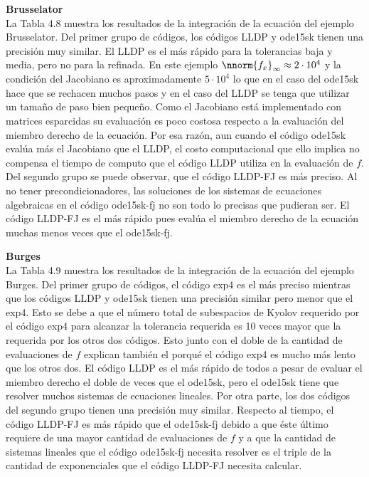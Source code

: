 \textbf{Brusselator}\\
La Tabla 4.8 muestra los resultados de la integración de la ecuación del ejemplo Brusselator. Del primer grupo de códigos, los códigos LLDP y ode15sk tienen una precisión muy similar. El LLDP es el más rápido para la tolerancias baja y media, pero no para la refinada. En este ejemplo $\nnorm{f_x}_\infty\approx 2\cdot 10^4$ y la condición del Jacobiano es aproximadamente $5\cdot10^4$ lo que en el caso del ode15sk hace que se rechacen muchos pasos y en el caso del LLDP se tenga que utilizar un tama\~no de paso bien peque\~no. Como el Jacobiano está implementado con matrices esparcidas su evaluación es poco costosa respecto a la evaluación del miembro derecho de la ecuación. Por esa razón, aun cuando el código ode15sk evalúa más el Jacobiano que el LLDP, el costo computacional que ello implica no compensa el tiempo de computo que el código LLDP utiliza en la evaluación de $f$. Del segundo grupo se puede observar, que  el código LLDP-FJ es m\'as preciso. Al no tener precondicionadores, las soluciones de los sistemas de ecuaciones algebraicas en el código  ode15sk-fj no son todo lo precisas que pudieran ser. El código LLDP-FJ es el más rápido pues evalúa el miembro derecho de la ecuación muchas menos veces que el ode15sk-fj.

\textbf{Burges}\\
La Tabla 4.9 muestra los resultados de la integración de la ecuación del ejemplo Burges. Del primer grupo de códigos, el código exp4 es el más preciso mientras que los códigos LLDP y ode15sk tienen una precisión similar pero menor que el exp4. Esto se debe a que el número total de subespacios de Kyolov requerido por el código exp4 para alcanzar la tolerancia requerida es 10 veces mayor que la requerida por los otros dos códigos. Esto junto con el doble de la cantidad de evaluaciones de $f$ explican también el porqué el código exp4 es mucho más lento que los otros dos. El código LLDP es el más rápido de todos a pesar de evaluar el miembro derecho el doble de veces que el ode15sk, pero el ode15sk tiene que resolver muchos sistemas de ecuaciones lineales. Por otra parte, los dos códigos del segundo grupo tienen una precisión muy similar. Respecto al tiempo, el código LLDP-FJ es más rápido que
el ode15sk-fj debido a que éste último requiere de una mayor cantidad de evaluaciones de $f$ y a que la cantidad de sistemas lineales 
que el código ode15sk-fj necesita resolver es el triple de la cantidad de exponenciales que el código LLDP-FJ necesita calcular.

